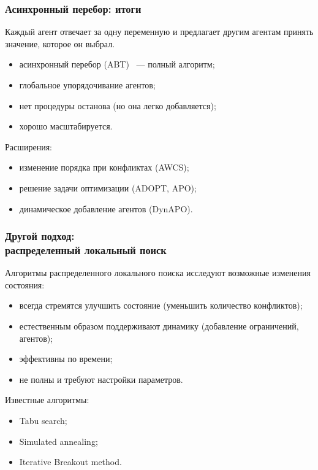 \documentclass{beamer}
\begin{document}

\begin{frame}
  \frametitle{Асинхронный перебор: итоги}
  Каждый агент отвечает за одну переменную и предлагает другим агентам принять значение,
  которое он выбрал.
  \begin{itemize}
    \item асинхронный перебор (ABT) ~--- полный алгоритм;
    \item глобальное упорядочивание агентов;
    \item нет процедуры останова (но она легко добавляется);
    \item хорошо масштабируется.
  \end{itemize}

  Расширения:
  \begin{itemize}
    \item изменение порядка при конфликтах (AWCS);
    \item решение задачи оптимизации (ADOPT, APO);
    \item динамическое добавление агентов (DynAPO).
  \end{itemize}
\end{frame}

\begin{frame}
  \frametitle{Другой подход: \\ распределенный локальный поиск}
  Алгоритмы распределенного локального поиска исследуют возможные изменения состояния:
  \begin{itemize}
    \item всегда стремятся улучшить состояние (уменьшить количество конфликтов);
    \item естественным образом поддерживают динамику (добавление ограничений, агентов);
    \item эффективны по времени;
    \item не полны и требуют настройки параметров.
  \end{itemize}

  Известные алгоритмы:
  \begin{itemize}
    \item Tabu search;
    \item Simulated annealing;
    \item Iterative Breakout method.
  \end{itemize}
\end{frame}
\end{document}
